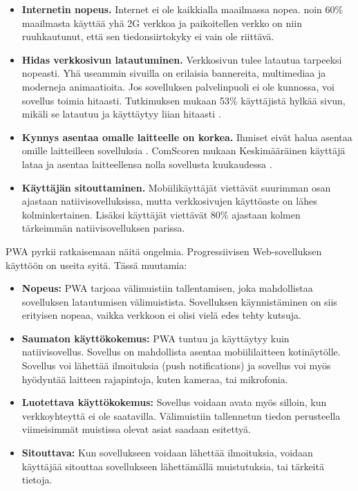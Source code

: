 \documentclass{tktltiki}
\begin{document}
\begin{itemize}
  \item \textbf{Internetin nopeus.} Internet ei ole kaikkialla maailmassa nopea. noin 60\% maailmasta käyttää yhä 2G verkkoa \cite{Kapoor} ja paikoitellen verkko on niin ruuhkautunut, että sen tiedonsiirtokyky ei vain ole riittävä.
  \item \textbf{Hidas verkkosivun latautuminen.} Verkkosivun tulee latautua tarpeeksi nopeasti. Yhä useammin sivuilla on erilaisia bannereita, multimediaa ja moderneja animaatioita. Jos sovelluksen palvelinpuoli ei ole kunnossa, voi sovellus toimia hitaasti. Tutkimuksen mukaan 53\% käyttäjistä hylkää sivun, mikäli se latautuu ja käyttäytyy liian hitaasti \cite{Kapoor}.
  \item \textbf{Kynnys asentaa omalle laitteelle on korkea.} Ihmiset eivät halua asentaa omille laitteilleen sovelluksia \cite{Kapoor}. ComScoren mukaan Keskimääräinen käyttäjä lataa ja asentaa laitteellensa nolla sovellusta kuukaudessa \cite{Perez}.
  \item \textbf{Käyttäjän sitouttaminen.} Mobiilikäyttäjät viettävät suurimman osan ajastaan natiivisovelluksissa, mutta verkkosivujen käyttöaste on lähes kolminkertainen. Lisäksi käyttäjät viettävät 80\% ajastaan kolmen tärkeimmän natiivisovelluksen parissa. 
\end{itemize}

PWA pyrkii ratkaisemaan näitä ongelmia. Progressiivisen Web-sovelluksen käyttöön on useita syitä. Tässä muutamia:

\begin{itemize}
  \item \textbf{Nopeus:} PWA tarjoaa välimuistiin tallentamisen, joka mahdollistaa sovelluksen latautumisen välimuistista. Sovelluksen käynnistäminen on siis erityisen nopeaa, vaikka verkkoon ei olisi vielä edes tehty kutsuja.
  \item \textbf{Saumaton käyttökokemus:} PWA tuntuu ja käyttäytyy kuin natiivisovellus. Sovellus on mahdollista asentaa mobiililaitteen kotinäytölle. Sovellus voi lähettää ilmoituksia (push notifications) ja sovellus voi myös hyödyntää laitteen rajapintoja, kuten kameraa, tai mikrofonia. 
  \item \textbf{Luotettava käyttökokemus:} Sovellus voidaan avata myös silloin, kun verkkoyhteyttä ei ole saatavilla. Välimuistiin tallennetun tiedon perusteella viimeisimmät muistissa olevat asiat saadaan esitettyä. 
  \item \textbf{Sitouttava:} Kun sovellukseen voidaan lähettää ilmoituksia, voidaan käyttäjää sitouttaa sovellukseen lähettämällä muistutuksia, tai tärkeitä tietoja. 
\end{itemize}
\end{document}
